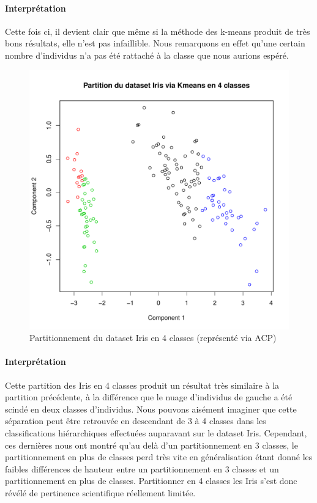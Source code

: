\documentclass{report}
\begin{document}
\paragraph{Interprétation}
Cette fois ci, il devient clair que même si la méthode des k-means produit de très bons résultats, elle n'est pas infaillible. Nous remarquons en effet qu'une certain nombre d'individus n'a pas été rattaché à la classe que nous aurions espéré.
\begin{figure}[ht!]
\begin{center}
    \includegraphics[width=\textwidth]{../plots/E3Q1_ki4.pdf}
    \caption{Partitionnement du dataset Iris en 4 classes (représenté via ACP)}
\end{center}
\end{figure}
\newpage
\paragraph{Interprétation}
Cette partition des Iris en 4 classes produit un résultat très similaire à la partition précédente, à la différence que le nuage d'individus de gauche a été scindé en deux classes d'individus. Nous pouvons aisément imaginer que cette séparation peut être retrouvée en descendant de 3 à 4 classes dans les classifications hiérarchiques effectuées auparavant sur le dataset Iris. Cependant, ces dernières nous ont montré qu'au delà d'un partitionnement en 3 classes, le partitionnement en plus de classes perd très vite en généralisation étant donné les faibles différences de hauteur entre un partitionnement en 3 classes et un partitionnement en plus de classes. Partitionner en 4 classes les Iris s'est donc révélé de pertinence scientifique réellement limitée.
\end{document}
